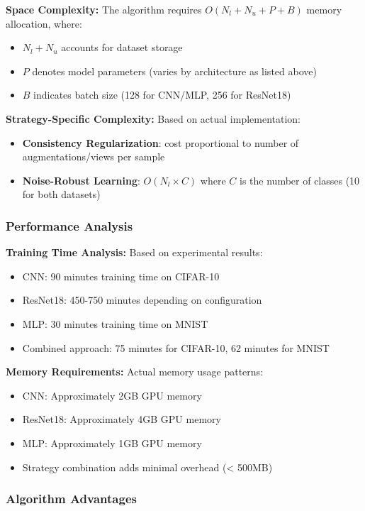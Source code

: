 \documentclass{ieeeaccess}
\begin{document}
\textbf{Space Complexity:} The algorithm requires $O(N_l + N_u + P + B)$ memory allocation, where:
\begin{itemize}
\item $N_l + N_u$ accounts for dataset storage
\item $P$ denotes model parameters (varies by architecture as listed above)
\item $B$ indicates batch size (128 for CNN/MLP, 256 for ResNet18)
\end{itemize}

\textbf{Strategy-Specific Complexity:} Based on actual implementation:
\begin{itemize}
\item \textbf{Consistency Regularization}: cost proportional to number of augmentations/views per sample
\item \textbf{Noise-Robust Learning}: $O(N_l \times C)$ where $C$ is the number of classes (10 for both datasets)
\end{itemize}

\subsubsection{Performance Analysis}

\textbf{Training Time Analysis:} Based on experimental results:
\begin{itemize}
\item CNN: 90 minutes training time on CIFAR-10
\item ResNet18: 450-750 minutes depending on configuration
\item MLP: 30 minutes training time on MNIST
\item Combined approach: 75 minutes for CIFAR-10, 62 minutes for MNIST
\end{itemize}

\textbf{Memory Requirements:} Actual memory usage patterns:
\begin{itemize}
\item CNN: Approximately 2GB GPU memory
\item ResNet18: Approximately 4GB GPU memory
\item MLP: Approximately 1GB GPU memory
\item Strategy combination adds minimal overhead (< 500MB)
\end{itemize}

\subsubsection{Algorithm Advantages}
\end{document}
